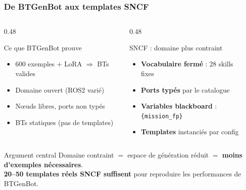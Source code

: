 \documentclass[aspectratio=169]{beamer}
\begin{document}
\begin{frame}
  \frametitle{De BTGenBot aux templates SNCF}

  \begin{columns}
    \begin{column}{0.48\textwidth}
      \begin{block}{Ce que BTGenBot prouve}
        {\small\begin{itemize}
          \item 600 exemples + LoRA $\Rightarrow$ BTs valides
          \item Domaine ouvert (ROS2 varié)
          \item Nœuds libres, ports non typés
          \item BTs statiques (pas de templates)
        \end{itemize}}
      \end{block}
    \end{column}
    \begin{column}{0.48\textwidth}
      \begin{exampleblock}{SNCF : domaine plus contraint}
        {\small\begin{itemize}
          \item \textbf{Vocabulaire fermé} : 28 skills fixes
          \item \textbf{Ports typés} par le catalogue
          \item \textbf{Variables blackboard} : \texttt{\{mission\_fp\}}
          \item \textbf{Templates} instanciés par config
        \end{itemize}}
      \end{exampleblock}
    \end{column}
  \end{columns}

  \vspace{0.3em}
  \begin{alertblock}{\centering Argument central}
    \centering\small
    Domaine contraint $=$ espace de génération réduit $=$ \textbf{moins d'exemples nécessaires}.\\[0.1em]
    \textbf{20–50 templates réels SNCF suffisent} pour reproduire les performances de BTGenBot.
  \end{alertblock}
\end{frame}

\end{document}
